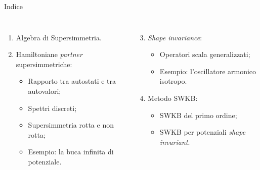 \documentclass[11pt,aspectratio=169,handout]{beamer}
\begin{document}
\begin{frame}{Indice}
    \begin{columns}       
       \begin{enumerate}
           \item Algebra di Supersimmetria.
               \vspace{0.3cm}
           \item Hamiltoniane \textit{partner} supersimmetriche:
               \begin{itemize}
                   \item Rapporto tra autostati e tra autovalori;
                  \item Spettri discreti;
                  \item Supersimmetria rotta e non rotta;
                  \item Esempio: la buca infinita di potenziale.
                \end{itemize}
        \end{enumerate}
        \begin{enumerate}
            \setcounter{enumi}{2} 
            \item \textit{Shape invariance}:
                \begin{itemize}
                    \item Operatori scala generalizzati;
                    \item Esempio: l'oscillatore armonico isotropo.
                \end{itemize}
                \vspace{0.3cm}
            \item Metodo SWKB:
                \begin{itemize}
                    \item SWKB del primo ordine;
                    \item SWKB per potenziali \textit{shape invariant}.
                \end{itemize}
        \end{enumerate}
    \end{columns}
\end{frame}

\appendix
\end{document}
